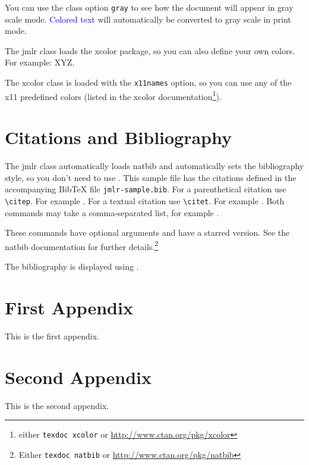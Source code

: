 \documentclass[pmlr,twocolumn,10pt]{jmlr} %
\begin{document}
You can use the class option \texttt{gray} to see how the
document will appear in gray scale mode. \textcolor{blue}{Colored
text} will automatically be converted to gray scale in print mode.

The \textsf{jmlr} class loads the \textsf{xcolor}
package, so you can also define your own colors. For example:
\ifprint
  {}%
  {}%
\textcolor{myred}{XYZ}.

The \textsf{xcolor} class is loaded with the \texttt{x11names}
option, so you can use any of the x11 predefined colors (listed
in the \textsf{xcolor} documentation\footnote{either 
\texttt{texdoc xcolor} or \url{http://www.ctan.org/pkg/xcolor}}).

\section{Citations and Bibliography}
\label{sec:cite}

The \textsf{jmlr} class automatically loads \textsf{natbib}
and automatically sets the bibliography style, so you don't need to
use \verb||.
This sample file has the citations defined in the accompanying
BibTeX file \texttt{jmlr-sample.bib}. For a parenthetical
citation use \verb|\citep|. For example
\citep{guyon-elisseeff-03}. For a textual citation use
\verb|\citet|. For example \citet{guyon2007causalreport}. 
Both commands may take a comma-separated list, for example
\citet{guyon-elisseeff-03,guyon2007causalreport}.

These commands have optional arguments and have a starred
version. See the \textsf{natbib} documentation for further
details.\footnote{Either \texttt{texdoc natbib} or
\url{http://www.ctan.org/pkg/natbib}}

The bibliography is displayed using \verb||.




\appendix

\section{First Appendix}\label{apd:first}

This is the first appendix.

\section{Second Appendix}\label{apd:second}

This is the second appendix.
\end{document}
